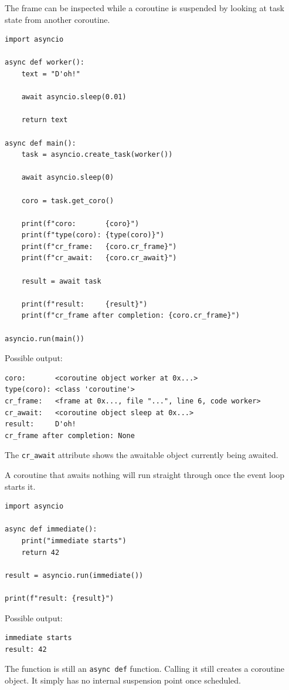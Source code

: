 The frame can be inspected while a coroutine is suspended by looking at task state from another coroutine.

\begin{verbatim}
import asyncio

async def worker():
    text = "D'oh!"

    await asyncio.sleep(0.01)

    return text

async def main():
    task = asyncio.create_task(worker())

    await asyncio.sleep(0)

    coro = task.get_coro()

    print(f"coro:       {coro}")
    print(f"type(coro): {type(coro)}")
    print(f"cr_frame:   {coro.cr_frame}")
    print(f"cr_await:   {coro.cr_await}")

    result = await task

    print(f"result:     {result}")
    print(f"cr_frame after completion: {coro.cr_frame}")

asyncio.run(main())
\end{verbatim}

Possible output:

\begin{verbatim}
coro:       <coroutine object worker at 0x...>
type(coro): <class 'coroutine'>
cr_frame:   <frame at 0x..., file "...", line 6, code worker>
cr_await:   <coroutine object sleep at 0x...>
result:     D'oh!
cr_frame after completion: None
\end{verbatim}

The \texttt{cr\_await} attribute shows the awaitable object currently being awaited.

A coroutine that awaits nothing will run straight through once the event loop starts it.

\begin{verbatim}
import asyncio

async def immediate():
    print("immediate starts")
    return 42

result = asyncio.run(immediate())

print(f"result: {result}")
\end{verbatim}

Possible output:

\begin{verbatim}
immediate starts
result: 42
\end{verbatim}

The function is still an \texttt{async def} function. Calling it still creates a coroutine object. It simply has no internal suspension point once scheduled.

